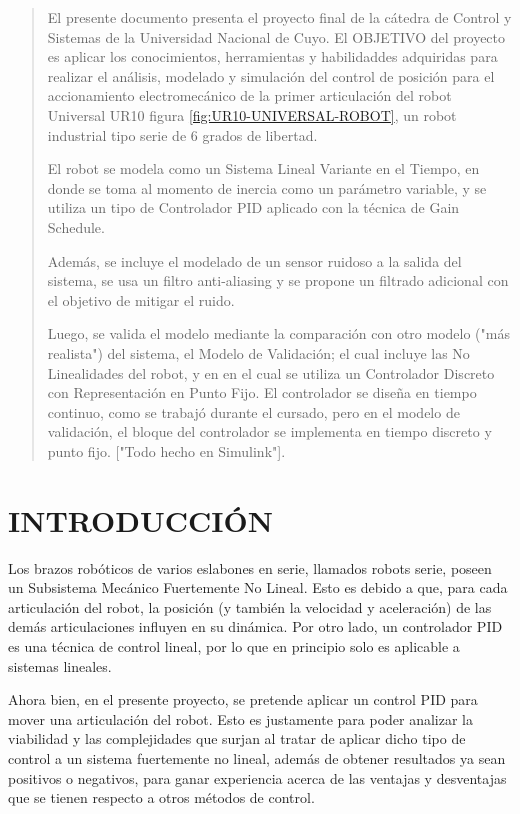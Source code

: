\documentclass{article}
\begin{document}
\begin{abstract}
    El presente documento presenta el proyecto final de la cátedra de Control y Sistemas de la Universidad Nacional de Cuyo.
    El OBJETIVO del proyecto es aplicar los conocimientos, herramientas y habilidaddes adquiridas para realizar el análisis, modelado y simulación del control de posición para el accionamiento electromecánico de la primer articulación del robot Universal UR10 figura \ref{fig:UR10-UNIVERSAL-ROBOT}, un robot industrial tipo serie de 6 grados de libertad.

    El robot se modela como un Sistema Lineal Variante en el Tiempo, en donde se toma al momento de inercia como un parámetro variable, y se utiliza un tipo de Controlador PID aplicado con la técnica de Gain Schedule.

    Además, se incluye el modelado de un sensor ruidoso a la salida del sistema, se usa un filtro anti-aliasing y se propone un filtrado adicional con el objetivo de mitigar el ruido.

    Luego, se valida el modelo mediante la comparación con otro modelo ("más realista") del sistema, el Modelo de Validación; el cual incluye las No Linealidades del robot, y en en el cual se utiliza un Controlador Discreto con Representación en Punto Fijo. El controlador se diseña en tiempo continuo, como se trabajó durante el cursado, pero en el modelo de validación, el bloque del controlador se implementa en tiempo discreto y punto fijo. ["Todo hecho en Simulink"].

\end{abstract}




\section{INTRODUCCIÓN}
\label{sec:INTRODUCCIÓN}

Los brazos robóticos de varios eslabones en serie, llamados robots serie, poseen un Subsistema Mecánico Fuertemente No Lineal. Esto es debido a que, para cada articulación del robot, la posición (y también la velocidad y aceleración) de las demás articulaciones influyen en su dinámica.
Por otro lado, un controlador PID es una técnica de control lineal, por lo que en principio solo es aplicable a sistemas lineales.

Ahora bien, en el presente proyecto, se pretende aplicar un control PID para mover una articulación del robot. Esto es justamente para poder analizar la viabilidad y las complejidades que surjan al tratar de aplicar dicho tipo de control a un sistema fuertemente no lineal, además de obtener resultados ya sean positivos o negativos, para ganar experiencia acerca de las ventajas y desventajas que se tienen respecto a otros métodos de control.
\end{document}
